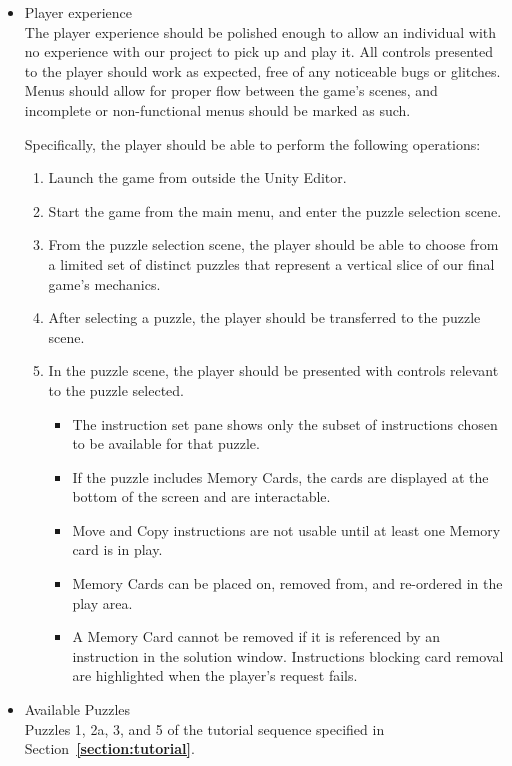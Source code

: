 \begin{itemize}
	\item Player experience\\
	The player experience should be polished enough to allow an individual with no 
	experience with our project to pick up and play it. All controls presented to the 
	player should work as expected, free of any noticeable bugs or glitches. Menus 
	should allow for proper flow between the game's scenes, and incomplete or 
	non-functional menus should be marked as such.

	Specifically, the player should be able to perform the following operations:
	\begin{enumerate}
		\item Launch the game from outside the Unity Editor.
		\item Start the game from the main menu, and enter the puzzle selection scene.
		\item From the puzzle selection scene, the player should be able to choose from 
		a limited set of distinct puzzles that represent a vertical slice of our final game's mechanics.
		\item After selecting a puzzle, the player should be transferred to the puzzle scene.
		\item In the puzzle scene, the player should be presented with controls relevant to the 
		puzzle selected.
		\begin{itemize}
			\item The instruction set pane shows only the subset of instructions chosen 
			to be available for that puzzle.
			\item If the puzzle includes Memory Cards, the cards are displayed at the 
			bottom of the screen and are interactable.
			\item Move and Copy instructions are not usable until at least one 
			Memory card is in play.
			\item Memory Cards can be placed on, removed from, and re-ordered in 
			the play area.
			\item A Memory Card cannot be removed if it is referenced by an 
			instruction in the solution window. Instructions blocking card removal are 
			highlighted when the player's request fails.
		\end{itemize}
	\end{enumerate}
	\item Available Puzzles\\
	Puzzles 1, 2a, 3, and 5 of the tutorial sequence specified in Section~\textbf{\ref{section:tutorial}}.

\end{itemize}
